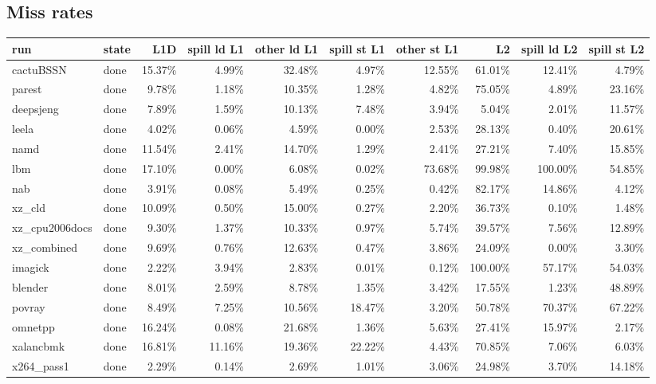 \documentclass[10pt,a4paper,landscape]{article}
\begin{document}
\subsection*{Miss rates}
{\footnotesize
\begin{longtable}{llrrrrrrrr}
\toprule
run & state & L1D & spill ld L1 & other ld L1 & spill st L1 & other st L1 & L2 & spill ld L2 & spill st L2 \\
\midrule
\endhead
\bottomrule
\endfoot
cactuBSSN & done & 15.37\% & 4.99\% & 32.48\% & 4.97\% & 12.55\% & 61.01\% & 12.41\% & 4.79\% \\
parest & done & 9.78\% & 1.18\% & 10.35\% & 1.28\% & 4.82\% & 75.05\% & 4.89\% & 23.16\% \\
deepsjeng & done & 7.89\% & 1.59\% & 10.13\% & 7.48\% & 3.94\% & 5.04\% & 2.01\% & 11.57\% \\
leela & done & 4.02\% & 0.06\% & 4.59\% & 0.00\% & 2.53\% & 28.13\% & 0.40\% & 20.61\% \\
namd & done & 11.54\% & 2.41\% & 14.70\% & 1.29\% & 2.41\% & 27.21\% & 7.40\% & 15.85\% \\
lbm & done & 17.10\% & 0.00\% & 6.08\% & 0.02\% & 73.68\% & 99.98\% & 100.00\% & 54.85\% \\
nab & done & 3.91\% & 0.08\% & 5.49\% & 0.25\% & 0.42\% & 82.17\% & 14.86\% & 4.12\% \\
xz\_cld & done & 10.09\% & 0.50\% & 15.00\% & 0.27\% & 2.20\% & 36.73\% & 0.10\% & 1.48\% \\
xz\_cpu2006docs & done & 9.30\% & 1.37\% & 10.33\% & 0.97\% & 5.74\% & 39.57\% & 7.56\% & 12.89\% \\
xz\_combined & done & 9.69\% & 0.76\% & 12.63\% & 0.47\% & 3.86\% & 24.09\% & 0.00\% & 3.30\% \\
imagick & done & 2.22\% & 3.94\% & 2.83\% & 0.01\% & 0.12\% & 100.00\% & 57.17\% & 54.03\% \\
blender & done & 8.01\% & 2.59\% & 8.78\% & 1.35\% & 3.42\% & 17.55\% & 1.23\% & 48.89\% \\
povray & done & 8.49\% & 7.25\% & 10.56\% & 18.47\% & 3.20\% & 50.78\% & 70.37\% & 67.22\% \\
omnetpp & done & 16.24\% & 0.08\% & 21.68\% & 1.36\% & 5.63\% & 27.41\% & 15.97\% & 2.17\% \\
xalancbmk & done & 16.81\% & 11.16\% & 19.36\% & 22.22\% & 4.43\% & 70.85\% & 7.06\% & 6.03\% \\
x264\_pass1 & done & 2.29\% & 0.14\% & 2.69\% & 1.01\% & 3.06\% & 24.98\% & 3.70\% & 14.18\% \\

\end{longtable}}
\end{document}
